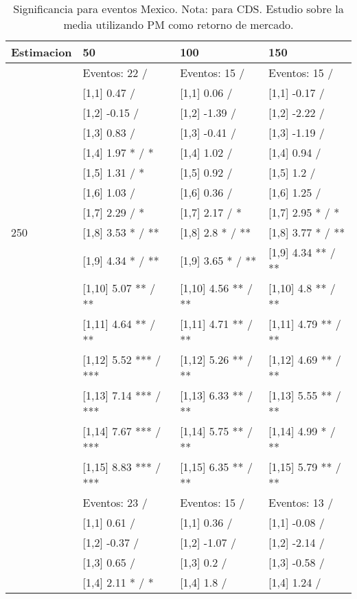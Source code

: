 \begin{table}

\caption{Significancia para eventos Mexico. Nota: para CDS. Estudio sobre la media utilizando PM como retorno de mercado.}
\centering
\begin{tabular}[t]{llll}
\toprule
Estimacion & 50 & 100 & 150\\
\midrule
 & Eventos:  22 / & Eventos:  15 / & Eventos:  15 /\\
 & {}[1,1] 0.47  / & {}[1,1] 0.06  / & {}[1,1] -0.17  /\\
 & {}[1,2] -0.15  / & {}[1,2] -1.39  / & {}[1,2] -2.22  /\\
 & {}[1,3] 0.83  / & {}[1,3] -0.41  / & {}[1,3] -1.19  /\\
 & {}[1,4] 1.97 * / * & {}[1,4] 1.02  / & {}[1,4] 0.94  /\\
\addlinespace
 & {}[1,5] 1.31  / * & {}[1,5] 0.92  / & {}[1,5] 1.2  /\\
 & {}[1,6] 1.03  / & {}[1,6] 0.36  / & {}[1,6] 1.25  /\\
 & {}[1,7] 2.29  / * & {}[1,7] 2.17  / * & {}[1,7] 2.95 * / *\\
250 & {}[1,8] 3.53 * / ** & {}[1,8] 2.8 * / ** & {}[1,8] 3.77 * / **\\
 & {}[1,9] 4.34 * / ** & {}[1,9] 3.65 * / ** & {}[1,9] 4.34 ** / **\\
\addlinespace
 & {}[1,10] 5.07 ** / ** & {}[1,10] 4.56 ** / ** & {}[1,10] 4.8 ** / **\\
 & {}[1,11] 4.64 ** / ** & {}[1,11] 4.71 ** / ** & {}[1,11] 4.79 ** / **\\
 & {}[1,12] 5.52 *** / *** & {}[1,12] 5.26 ** / ** & {}[1,12] 4.69 ** / **\\
 & {}[1,13] 7.14 *** / *** & {}[1,13] 6.33 ** / ** & {}[1,13] 5.55 ** / **\\
 & {}[1,14] 7.67 *** / *** & {}[1,14] 5.75 ** / ** & {}[1,14] 4.99 * / **\\
\addlinespace
 & {}[1,15] 8.83 *** / *** & {}[1,15] 6.35 ** / ** & {}[1,15] 5.79 ** / **\\
 & Eventos:  23 / & Eventos:  15 / & Eventos:  13 /\\
 & {}[1,1] 0.61  / & {}[1,1] 0.36  / & {}[1,1] -0.08  /\\
 & {}[1,2] -0.37  / & {}[1,2] -1.07  / & {}[1,2] -2.14  /\\
 & {}[1,3] 0.65  / & {}[1,3] 0.2  / & {}[1,3] -0.58  /\\
\addlinespace
 & {}[1,4] 2.11 * / * & {}[1,4] 1.8  / & {}[1,4] 1.24  /\\

\end{tabular}
\end{table}
